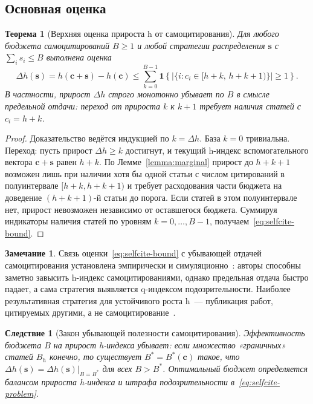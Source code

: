 \documentclass[12pt,a4paper]{article}
\newtheorem{theorem}{Теорема}
\newtheorem{corollary}{Следствие}
\theoremstyle{definition}
\newtheorem{remark}{Замечание}
\newcommand{\ind}[1]{\mathbf{1}\!\left\{#1\right\}}
\begin{document}
\subsection{Основная оценка}

\begin{theorem}[Верхняя оценка прироста h от самоцитирования]
  \label{thm:selfcite}
  Для любого бюджета самоцитирований $B \geq 1$ и любой стратегии
  распределения $\bm{s}$ с $\sum_i s_i \leq B$ выполнена оценка
  \begin{equation}
    \Delta h(\bm{s}) = h(\bm{c} + \bm{s}) - h(\bm{c}) \leq
    \sum_{k=0}^{B-1} \ind{|\{i : c_i \in [h+k,\, h+k+1)\}| \geq 1}.
    \label{eq:selfcite-bound}
  \end{equation}
  В частности, прирост $\Delta h$ строго монотонно убывает по $B$ в
  смысле предельной отдачи: переход от прироста $k$ к $k+1$ требует
  наличия статей с $c_i = h+k$.
\end{theorem}

\begin{proof}
  Доказательство ведётся индукцией по $k = \Delta h$. База $k = 0$
  тривиальна. Переход: пусть прирост $\Delta h \geq k$ достигнут, и
  текущий h-индекс вспомогательного вектора $\bm{c} + \bm{s}$ равен
  $h + k$. По Лемме~\ref{lemma:marginal} прирост до $h + k + 1$
  возможен лишь при наличии хотя бы одной статьи с числом цитирований
  в полуинтервале $[h+k, h+k+1)$ и требует расходования части бюджета
  на доведение $(h+k+1)$-й статьи до порога. Если статей в этом
  полуинтервале нет, прирост невозможен независимо от оставшегося
  бюджета. Суммируя индикаторы наличия статей по уровням $k = 0,
  \dots, B-1$, получаем~\eqref{eq:selfcite-bound}.
\end{proof}

\begin{remark}
  Связь оценки~\eqref{eq:selfcite-bound} с убывающей отдачей
  самоцитирования установлена эмпирически и
  симуляционно~\citep{bartneck2011}: авторы способны заметно завысить
  h-индекс самоцитированиями, однако предельная отдача быстро падает,
  а сама стратегия выявляется q-индексом подозрительности. Наиболее
  результативная стратегия для устойчивого роста h~--- публикация
  работ, цитируемых другими, а не самоцитирование~\citep{bartneck2011}.
\end{remark}

\begin{corollary}[Закон убывающей полезности самоцитирования]
  \label{cor:diminishing}
  Эффективность бюджета $B$ на прирост h-индекса убывает: если
  множество «граничных» статей $B_h$ конечно, то существует $B^{*} =
  B^{*}(\bm{c})$ такое, что $\Delta h(\bm{s}) = \Delta h(\bm{s})|_{B
  = B^*}$ для всех $B > B^*$. Оптимальный бюджет определяется
  балансом прироста h-индекса и штрафа подозрительности
  в~\eqref{eq:selfcite-problem}.
\end{corollary}
\end{document}
